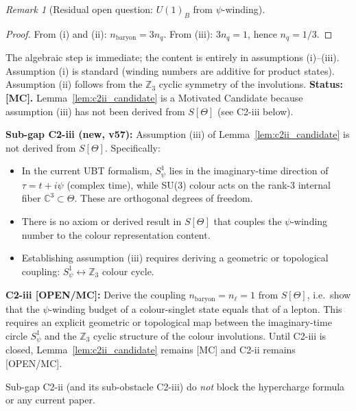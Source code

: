\documentclass[12pt,a4paper]{article}
\theoremstyle{definition}
\theoremstyle{remark}
\newtheorem{remark}[theorem]{Remark}
\begin{document}
\begin{remark}[Residual open question: $U(1)_B$ from $\psi$-winding]
\begin{proof}
From (i) and (ii): $n_{\mathrm{baryon}}=3n_q$.
From (iii): $3n_q=1$, hence $n_q=1/3$.
\end{proof}

\noindent
The algebraic step is immediate; the content is entirely in assumptions (i)--(iii).
Assumption (i) is standard (winding numbers are additive for product states).
Assumption (ii) follows from the $\mathbb{Z}_3$ cyclic symmetry of the involutions.
\textbf{Status: [MC].}  Lemma~\ref{lem:c2ii_candidate} is a Motivated Candidate because
assumption (iii) has not been derived from $S[\Theta]$ (see C2-iii below).

\medskip
\noindent\textbf{Sub-gap C2-iii (new, v57):}
Assumption (iii) of Lemma~\ref{lem:c2ii_candidate} is not derived from $S[\Theta]$.
Specifically:
\begin{itemize}
  \item In the current UBT formalism, $S^1_\psi$ lies in the imaginary-time
    direction of $\tau=t+i\psi$ (complex time), while SU(3) colour acts on the
    rank-3 internal fiber $\mathbb{C}^3\subset\Theta$.  These are orthogonal
    degrees of freedom.
  \item There is no axiom or derived result in $S[\Theta]$ that couples the
    $\psi$-winding number to the colour representation content.
  \item Establishing assumption (iii) requires deriving a geometric or
    topological coupling: $S^1_\psi \leftrightarrow \mathbb{Z}_3$ colour cycle.
\end{itemize}

\textbf{C2-iii [OPEN/MC]:} Derive the coupling $n_{\mathrm{baryon}}=n_\ell=1$
from $S[\Theta]$, i.e.\ show that the $\psi$-winding budget of a colour-singlet
state equals that of a lepton.  This requires an explicit geometric or
topological map between the imaginary-time circle $S^1_\psi$ and the
$\mathbb{Z}_3$ cyclic structure of the colour involutions.
Until C2-iii is closed, Lemma~\ref{lem:c2ii_candidate} remains [MC] and
C2-ii remains [OPEN/MC].

\medskip
\noindent
Sub-gap C2-ii (and its sub-obstacle C2-iii) do \emph{not} block the
hypercharge formula or any current paper.
\end{remark}
\end{document}

